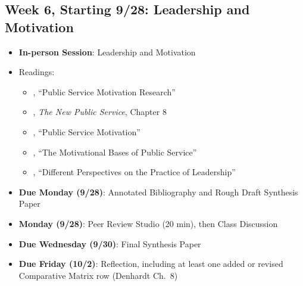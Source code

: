 \documentclass[11pt]{article}     %
\begin{document}
\subsection*{Week 6, Starting 9/28: Leadership and Motivation}
\begin{itemize}
    \item \textbf{In-person Session}: Leadership and Motivation
    \item Readings:
        \begin{itemize}
            \item \citet{Christensen2017}, ``Public Service Motivation Research''
            \item \citet{Denhardt2015}, \emph{The New Public Service}, Chapter 8
            \item \citet{Lachance2017}, ``Public Service Motivation''
            \item \citet{perry1990}, ``The Motivational Bases of Public Service''
            \item \citet{Fairholm2004}, ``Different Perspectives on the Practice of Leadership''
        \end{itemize}
    \item \textbf{Due Monday (9/28)}: Annotated Bibliography and Rough Draft Synthesis Paper
    \item \textbf{Monday (9/28)}: Peer Review Studio (20 min), then Class Discussion
    \item \textbf{Due Wednesday (9/30)}: Final Synthesis Paper
    \item \textbf{Due Friday (10/2)}: Reflection, including at least one added or revised Comparative Matrix row (Denhardt Ch.\ 8)
\end{itemize}
\end{document}
